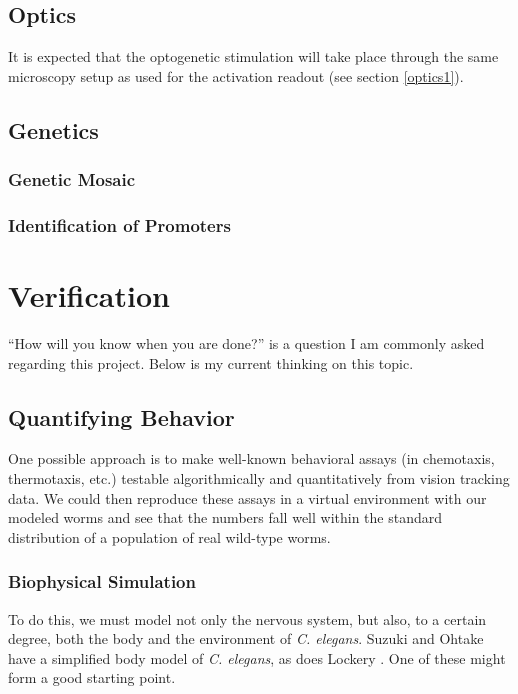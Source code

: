 \documentclass[letter,11pt]{article}
\newcommand{\cel}{{\em C. elegans}}
\begin{document}
\subsection{Optics}

It is expected that the optogenetic stimulation will take place through the same microscopy setup
as used for the activation readout (see section \ref{optics1}).

\subsection{Genetics}
\label{genetics}

\subsubsection{Genetic Mosaic}

\subsubsection{Identification of Promoters}


\section{Verification}


``How will you know when you are done?'' is a question I am commonly asked regarding this project.
Below is my current thinking on this topic.

\subsection{Quantifying Behavior}

One possible approach is to make well-known behavioral assays (in chemotaxis,
thermotaxis, etc.) testable algorithmically and quantitatively from vision
tracking data.  We could then reproduce these assays in a virtual environment
with our modeled worms and see that the numbers fall well within the standard
distribution of a population of real wild-type worms.

\subsubsection{Biophysical Simulation}

To do this, we must model not only the nervous system, but also, to a certain degree, both the body and the environment of \cel .
Suzuki and Ohtake \cite{ohtake} have a simplified body model of \cel , as does Lockery \cite{lockery1010}. One of these might form
a good starting point.
\end{document}
